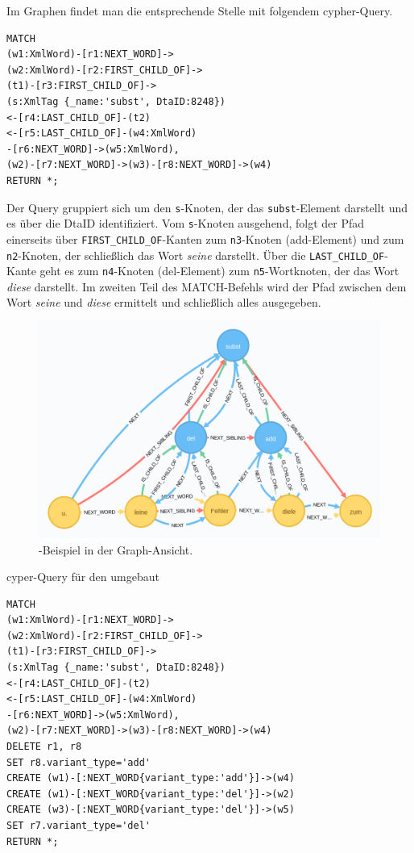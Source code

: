 \documentclass[ngerman,]{scrreprt}
\begin{document}
Im Graphen findet man die entsprechende Stelle mit folgendem cypher-Query.

\begin{verbatim}
MATCH
(w1:XmlWord)-[r1:NEXT_WORD]->
(w2:XmlWord)-[r2:FIRST_CHILD_OF]->
(t1)-[r3:FIRST_CHILD_OF]->
(s:XmlTag {_name:'subst', DtaID:8248})
<-[r4:LAST_CHILD_OF]-(t2)
<-[r5:LAST_CHILD_OF]-(w4:XmlWord)
-[r6:NEXT_WORD]->(w5:XmlWord),
(w2)-[r7:NEXT_WORD]->(w3)-[r8:NEXT_WORD]->(w4)
RETURN *;
\end{verbatim}

Der Query gruppiert sich um den \texttt{s}-Knoten, der das \texttt{subst}-Element darstellt und es über die DtaID identifiziert. Vom \texttt{s}-Knoten ausgehend, folgt der Pfad einerseits über \texttt{FIRST\_CHILD\_OF}-Kanten zum \texttt{n3}-Knoten (add-Element) und zum \texttt{n2}-Knoten, der schließlich das Wort \emph{seine} darstellt. Über die \texttt{LAST\_CHILD\_OF}-Kante geht es zum \texttt{n4}-Knoten (del-Element) zum \texttt{n5}-Wortknoten, der das Wort \emph{diese} darstellt. Im zweiten Teil des MATCH-Befehls wird der Pfad zwischen dem Wort \emph{seine} und \emph{diese} ermittelt und schließlich alles ausgegeben.

\begin{figure}
\centering
\includegraphics{Bilder/TEI2Graph/subst-graph-1.png}
\caption{-Beispiel in der Graph-Ansicht.}
\end{figure}

cyper-Query für den umgebaut

\begin{verbatim}
MATCH
(w1:XmlWord)-[r1:NEXT_WORD]->
(w2:XmlWord)-[r2:FIRST_CHILD_OF]->
(t1)-[r3:FIRST_CHILD_OF]->
(s:XmlTag {_name:'subst', DtaID:8248})
<-[r4:LAST_CHILD_OF]-(t2)
<-[r5:LAST_CHILD_OF]-(w4:XmlWord)
-[r6:NEXT_WORD]->(w5:XmlWord),
(w2)-[r7:NEXT_WORD]->(w3)-[r8:NEXT_WORD]->(w4)
DELETE r1, r8
SET r8.variant_type='add'
CREATE (w1)-[:NEXT_WORD{variant_type:'add'}]->(w4)
CREATE (w1)-[:NEXT_WORD{variant_type:'del'}]->(w2)
CREATE (w3)-[:NEXT_WORD{variant_type:'del'}]->(w5)
SET r7.variant_type='del'
RETURN *;
\end{verbatim}
\end{document}
